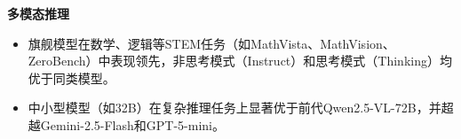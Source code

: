 \documentclass[zihao=false,fontset=windows]{ctexart}
\begin{document}
\textbf{多模态推理}\par

\begin{itemize}[label=\textcolor{feishuBlue}{\textbullet}]
\item 旗舰模型在数学、逻辑等STEM任务（如MathVista、MathVision、ZeroBench）中表现领先，非思考模式（Instruct）和思考模式（Thinking）均优于同类模型。

\end{itemize}

\begin{itemize}[label=\textcolor{feishuBlue}{\textbullet}]
\item 中小型模型（如32B）在复杂推理任务上显著优于前代Qwen2.5-VL-72B，并超越Gemini-2.5-Flash和GPT-5-mini。

\end{itemize}
\end{document}
